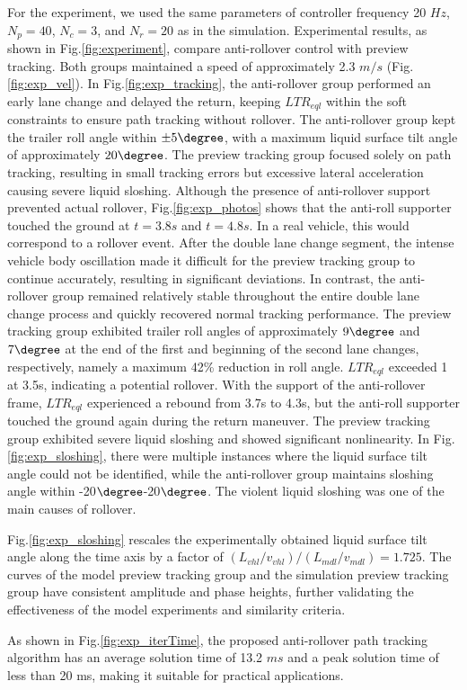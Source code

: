 For the experiment, we used the same parameters of controller frequency 20 $Hz$, $N_p = 40$, $N_c = 3$, and $N_r = 20$ as in the simulation. Experimental results, as shown in Fig.\ref{fig:experiment}, compare anti-rollover control with preview tracking. Both groups maintained a speed of approximately 2.3 $m/s$ (Fig.\ref{fig:exp_vel}). In Fig.\ref{fig:exp_tracking}, the anti-rollover group performed an early lane change and delayed the return, keeping $LTR_{eql}$ within the soft constraints to ensure path tracking without rollover. The anti-rollover group kept the trailer roll angle within $\pm 5\degree$, with a maximum liquid surface tilt angle of approximately $20\degree$. The preview tracking group focused solely on path tracking, resulting in small tracking errors but excessive lateral acceleration causing severe liquid sloshing. Although the presence of anti-rollover support prevented actual rollover, Fig.\ref{fig:exp_photos} shows that the anti-roll supporter touched the ground at $t=3.8s$ and $t=4.8s$. In a real vehicle, this would correspond to a rollover event. After the double lane change segment, the intense vehicle body oscillation made it difficult for the preview tracking group to continue accurately, resulting in significant deviations. In contrast, the anti-rollover group remained relatively stable throughout the entire double lane change process and quickly recovered normal tracking performance. The preview tracking group exhibited trailer roll angles of approximately $9\degree$ and $7\degree$ at the end of the first and beginning of the second lane changes, respectively, namely a maximum 42\% reduction in roll angle. $LTR_{eql}$ exceeded 1 at 3.5s, indicating a potential rollover. With the support of the anti-rollover frame, $LTR_{eql}$ experienced a rebound from 3.7s to 4.3s, but the anti-roll supporter touched the ground again during the return maneuver. The preview tracking group exhibited severe liquid sloshing and showed significant nonlinearity. In Fig.\ref{fig:exp_sloshing}, there were multiple instances where the liquid surface tilt angle could not be identified, while the anti-rollover group maintains sloshing angle within -20$\degree$-20$\degree$. The violent liquid sloshing was one of the main causes of rollover.

Fig.\ref{fig:exp_sloshing} rescales the experimentally obtained liquid surface tilt angle along the time axis by a factor of $(L_{vhl}/v_{vhl})/(L_{mdl}/v_{mdl})=1.725$. The curves of the model preview tracking group and the simulation preview tracking group have consistent amplitude and phase heights, further validating the effectiveness of the model experiments and similarity criteria.

As shown in Fig.\ref{fig:exp_iterTime}, the proposed anti-rollover path tracking algorithm has an average solution time of 13.2 $ms$ and a peak solution time of less than 20 ms, making it suitable for practical applications.














